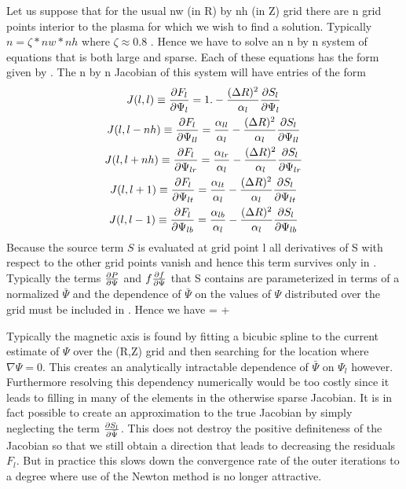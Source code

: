 Let us suppose that for the usual nw (in R) by nh (in Z) grid there are n grid
points interior to the plasma for which we wish to find a solution. Typically $
n = \zeta*nw*nh $ where $\zeta \approx 0.8$ . Hence we have to solve an n by n
system of equations that is both large and sparse. Each of these equations has
the form given by . The n by n Jacobian of this system will have
entries of the form
\begin{subequations}\label{mhd:J}
 \begin{gather}
  J(l,l) \equiv \frac{\partial{ F_l}}{\partial{ \Psi_l}} = 1.-\frac{(\Delta R )^2}{\alpha_l}
   \frac{\partial{ S_l}}{\partial{ \Psi_l}}              \label{mhd:J1}      \\
  J(l,l-nh) \equiv \frac{\partial{ F_l}}{\partial{ \Psi_{ll}}} =
   \frac{\alpha_{ll}}{\alpha_l}
   -\frac{(\Delta R )^2}{\alpha_l} \frac{\partial{ S_l}}{\partial{ \Psi_{ll}}} \label{mhd:J2} \\
  J(l,l+nh) \equiv \frac{\partial{ F_l}}{\partial{ \Psi_{lr}}} =
   \frac{\alpha_{lr}}{\alpha_l}
   -\frac{(\Delta R )^2}{\alpha_l} \frac{\partial{ S_l}}{\partial{ \Psi_{lr}}} \label{mhd:J3} \\
  J(l,l+1) \equiv \frac{\partial{ F_l}}{\partial{ \Psi_{lt}}} =
   \frac{\alpha_{lt}}{\alpha_l}
   -\frac{(\Delta R )^2}{\alpha_l} \frac{\partial{ S_l}}{\partial{ \Psi_{lt}}} \label{mhd:J4} \\
  J(l,l-1) \equiv \frac{\partial{ F_l}}{\partial{ \Psi_{lb}}} =
   \frac{\alpha_{lb}}{\alpha_l}
   -\frac{(\Delta R )^2}{\alpha_l} \frac{\partial{ S_l}}{\partial{ \Psi_{lb}}}  \label{mhd:J45}
 \end{gather}
\end{subequations}
Because the source term $S$ is evaluated at grid point l all derivatives
of S with respect to the other grid points vanish and hence this term
survives only in .  Typically the terms
$\frac{\partial{ P}}{\partial{ \Psi}}$ and $f\frac{\partial{ f}}{\partial{ \Psi}} $ that S contains are
parameterized in terms of a normalized $ \bar{\Psi}$ and the
dependence of $\bar{\Psi} $ on the values of $\Psi$ distributed over
the grid must be included in . Hence we have
\beq
  =  + 
\eeq

Typically the magnetic axis is found by fitting a bicubic spline to the current
estimate of $\Psi $ over the (R,Z) grid and then searching for the location
where $\nabla \Psi =0$. This creates an analytically intractable dependence of
$\bar{\Psi}$ on $\Psi_l $ however. Furthermore resolving this dependency
numerically would be too costly since it leads to filling in many of the
elements  in the otherwise sparse Jacobian.  It is in fact possible to create an
approximation to  the true Jacobian by simply neglecting the term
$\frac{\partial{ S_l}}{\partial{ \bar{\Psi}}}$. This does not destroy the positive definiteness of
the Jacobian so that we still obtain a direction that leads to decreasing the
residuals $F_l$.  But in practice this slows down the convergence rate of the
outer iterations to a degree where use of the Newton method is no longer
attractive.

